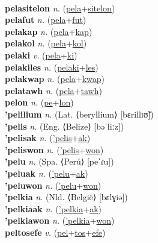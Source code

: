  \label{pelacailum} \\
\textbf{pelasitelon} \textit{n.} (\hyperref[pela]{pela}+\hyperref[sitelon]{sitelon})
 \label{pelasitelon} \\
\textbf{pelafut} \textit{n.} (\hyperref[pela]{pela}+\hyperref[fut]{fut})
 \label{pelafut} \\
\textbf{pelakap} \textit{n.} (\hyperref[pela]{pela}+\hyperref[kap]{kap})
 \label{pelakap} \\
\textbf{pelakol} \textit{n.} (\hyperref[pela]{pela}+\hyperref[kol]{kol})
 \label{pelakol} \\
\textbf{pelaki} \textit{v.} (\hyperref[pela]{pela}+\hyperref[ki]{ki})
 \label{pelaki} \\
\textbf{pelakiles} \textit{n.} (\hyperref[pelaki]{pelaki}+\hyperref[les]{les})
 \label{pelakiles} \\
\textbf{pelakwap} \textit{n.} (\hyperref[pela]{pela}+\hyperref[kwap]{kwap})
 \label{pelakwap} \\
\textbf{pelatawh} \textit{n.} (\hyperref[pela]{pela}+\hyperref[tawh]{tawh})
 \label{pelatawh} \\
\textbf{pelon} \textit{n.} (\hyperref[pe]{pe}+\hyperref[lon]{lon})
 \label{pelon} \\
\textbf{'pelilium} \textit{n.} (Lat. ⟨beryllium⟩ [bɛrillɪʊ̃])
 \label{'pelilium} \\
\textbf{'pelis} \textit{n.} (Eng. ⟨Belize⟩ [bəˈliːz])
 \label{'pelis} \\
\textbf{'pelisak} \textit{n.} (\hyperref['pelis]{'pelis}+\hyperref[ak]{ak})
 \label{'pelisak} \\
\textbf{'peliswon} \textit{n.} (\hyperref['pelis]{'pelis}+\hyperref[won]{won})
 \label{'peliswon} \\
\textbf{'pelu} \textit{n.} (Spa. ⟨Perú⟩ [peˈɾu])
 \label{'pelu} \\
\textbf{'peluak} \textit{n.} (\hyperref['pelu]{'pelu}+\hyperref[ak]{ak})
 \label{'peluak} \\
\textbf{'peluwon} \textit{n.} (\hyperref['pelu]{'pelu}+\hyperref[won]{won})
 \label{'peluwon} \\
\textbf{'pelkia} \textit{n.} (Nld. ⟨België⟩ [bɛlɣiə])
 \label{'pelkia} \\
\textbf{'pelkiaak} \textit{n.} (\hyperref['pelkia]{'pelkia}+\hyperref[ak]{ak})
 \label{'pelkiaak} \\
\textbf{'pelkiawon} \textit{n.} (\hyperref['pelkia]{'pelkia}+\hyperref[won]{won})
 \label{'pelkiawon} \\
\textbf{peltosefe} \textit{v.} (\hyperref[pel]{pel}+\hyperref[tos]{tos}+\hyperref[efe]{efe})
